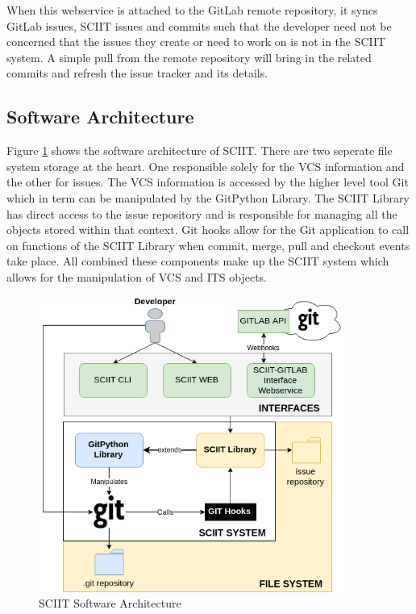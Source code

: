 \documentclass{mproj}
\begin{document}
When this webservice is attached to the GitLab remote repository, it syncs GitLab issues, SCIIT issues and commits such that the developer need not be concerned that the issues they create or need to work on is not in the SCIIT system. A simple pull from the remote repository will bring in the related commits and refresh the issue tracker and its details.

\subsection{Software Architecture}

Figure \ref{fig:sciit-software-arch} shows the software architecture of SCIIT. There are two seperate file system storage at the heart. One responsible solely for the VCS information and the other for issues. The VCS information is accessed by the higher level tool Git which in term can be manipulated by the GitPython Library. The SCIIT Library has direct access to the issue repository and is responsible for managing all the objects stored within that context. Git hooks allow for the Git application to call on functions of the SCIIT Library when commit, merge, pull and checkout events take place. All combined these components make up the SCIIT system which allows for the manipulation of VCS and ITS objects.


\begin{figure}[t]
\caption{SCIIT Software Architecture}
\label{fig:sciit-software-arch}
\centering
\includegraphics[width=10cm]{sciit-software-arch}
\end{figure}
\end{document}
